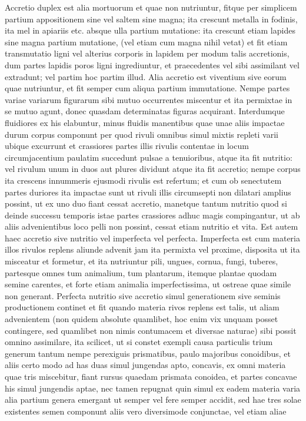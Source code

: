 %
\pend%
\vspace{0.7em}%
\pstart%
\noindent%
%
Accretio duplex est alia mortuorum et quae non nutriuntur, fitque per simplicem partium appositionem sine
vel saltem sine magna; ita crescunt metalla in fodinis, ita mel in apiariis etc. absque ulla partium mutatione: ita crescunt etiam lapides
sine magna partium mutatione, (vel etiam cum magna nihil vetat) et fit etiam transmutatio ligni vel alterius corporis in lapidem per modum talis accretionis,
dum partes lapidis poros ligni ingrediuntur, et praecedentes vel sibi assimilant vel extradunt; vel partim hoc partim illud.
\pend%
\pstart%
Alia accretio est viventium sive eorum quae nutriuntur, et fit semper cum aliqua partium immutatione.
Nempe partes variae variarum figurarum sibi mutuo occurrentes miscentur et ita permixtae in se mutuo agunt,
donec quasdam determinatas figuras acquirant.
Interdumque fluidiores ex his elabuntur, minus fluidis manentibus quae unae aliis impactae durum corpus componunt
per quod rivuli omnibus simul mixtis repleti varii ubique excurrunt et crassiores partes illis rivulis contentae in locum circumjacentium
paulatim succedunt pulsae a tenuioribus, atque ita fit nutritio:
vel rivulum unum in duos aut plures dividunt atque ita fit accretio;
nempe corpus ita crescens innummeris ejusmodi rivulis est refertum;
et cum ob senectutem partes duriores ita impactae sunt ut rivuli illis circumsepti non dilatari amplius possint,
ut ex uno duo fiant cessat accretio,
manetque tantum nutritio quod si deinde successu temporis istae partes crassiores adhuc magis compingantur,
ut ab aliis advenientibus loco pelli non possint, cessat etiam nutritio et vita.
\pend%
\count{}
\pstart%
Est autem haec accretio sive nutritio vel imperfecta vel perfecta.
Imperfecta est cum materia illos rivulos replens aliunde advenit jam ita permixta vel proxime, disposita ut ita misceatur et formetur, et ita nutriuntur pili, ungues, cornua, fungi, tuberes, partesque omnes tum animalium, tum plantarum, itemque plantae quodam semine carentes, et forte etiam animalia imperfectissima, ut ostreae quae simile non generant.
Perfecta nutritio sive accretio simul generationem sive seminis productionem continet et fit quando materia rivos replens est talis, ut aliam advenientem (non quidem absolute quamlibet, hoc enim vix unquam posset contingere, sed quamlibet non nimis contumacem et diversae naturae) sibi possit omnino assimilare, ita scilicet, ut si constet exempli causa particulis trium generum tantum nempe perexiguis prismatibus, paulo majoribus conoidibus, et aliis certo modo ad has duas simul jungendas apto, concavis, ex omni materia quae tris miscebitur, fiant rursus quaedam prismata conoidea, et partes concavae his simul jungendis aptae, nec tamen repugnat quin simul ex eadem materia varia alia partium genera emergant ut semper vel fere semper accidit, sed hae tres solae existentes semen componunt aliis vero diversimode conjunctae, vel etiam aliae
